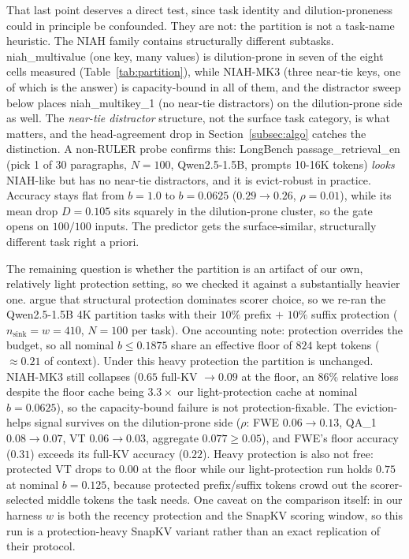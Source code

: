 That last point deserves a direct test, since task identity and
dilution-proneness could in principle be confounded. They are not: the
partition is not a task-name heuristic. The NIAH family contains
structurally different subtasks. niah\_multivalue (one key, many values)
is dilution-prone in seven of the eight cells measured
(Table~\ref{tab:partition}), while NIAH-MK3 (three near-tie keys, one of
which is the answer) is capacity-bound in all of them, and the distractor
sweep below places niah\_multikey\_1 (no near-tie distractors) on the
dilution-prone side as well. The \emph{near-tie distractor} structure,
not the surface task category, is what matters, and the head-agreement
drop in Section~\ref{subsec:algo} catches the distinction. A non-RULER
probe confirms this: LongBench passage\_retrieval\_en (pick 1 of 30
paragraphs, $N = 100$, Qwen2.5-1.5B, prompts 10-16K tokens) \emph{looks}
NIAH-like but has no near-tie distractors, and it is evict-robust in
practice. Accuracy stays flat from $b = 1.0$ to $b = 0.0625$ ($0.29 \to
0.26$, $\rho = 0.01$), while its mean drop $D = 0.105$ sits squarely in
the dilution-prone cluster, so the gate opens on $100/100$ inputs. The
predictor gets the surface-similar, structurally different task right a
priori.

The remaining question is whether the partition is an artifact of our
own, relatively light protection setting, so we checked it against a
substantially heavier one. \citet{arxiv260518053} argue that structural
protection dominates scorer choice, so we re-ran the Qwen2.5-1.5B 4K
partition tasks with their $10\%$ prefix $+$ $10\%$ suffix protection
($n_{\text{sink}} = w = 410$, $N = 100$ per task). One accounting note:
protection overrides the budget, so all nominal $b \le 0.1875$ share an
effective floor of $824$ kept tokens ($\approx 0.21$ of context). Under
this heavy protection the partition is unchanged. NIAH-MK3 still
collapses ($0.65$ full-KV $\to 0.09$ at the floor, an $86\%$ relative
loss despite the floor cache being $3.3\times$ our light-protection
cache at nominal $b = 0.0625$), so the capacity-bound failure is not
protection-fixable. The eviction-helps signal survives on the
dilution-prone side ($\rho$: FWE $0.06 \to 0.13$, QA\_1 $0.08 \to 0.07$,
VT $0.06 \to 0.03$, aggregate $0.077 \ge 0.05$), and FWE's floor accuracy
($0.31$) exceeds its full-KV accuracy ($0.22$). Heavy protection is also
not free: protected VT drops to $0.00$ at the floor while our
light-protection run holds $0.75$ at nominal $b = 0.125$, because
protected prefix/suffix tokens crowd out the scorer-selected middle
tokens the task needs. One caveat on the comparison itself: in our
harness $w$ is both the recency protection and the SnapKV scoring
window, so this run is a protection-heavy SnapKV variant rather than an
exact replication of their protocol.


